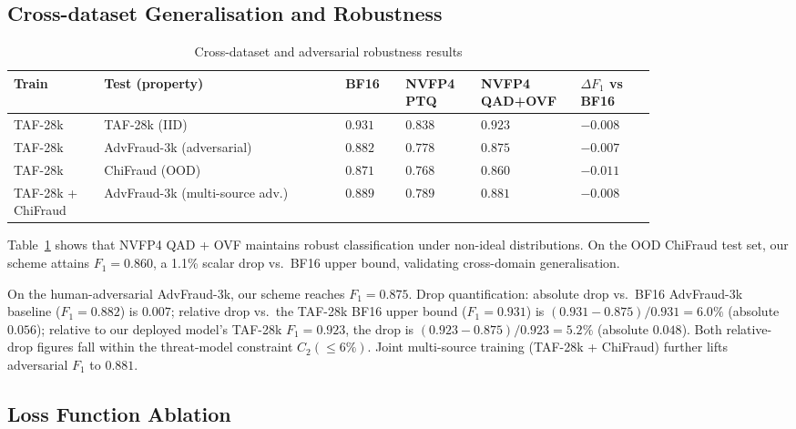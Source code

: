 \documentclass[11pt, a4paper]{article}
\begin{document}
\subsection{Cross-dataset Generalisation and Robustness}

\begin{table}[htbp]
\centering
\caption{Cross-dataset and adversarial robustness results}
\label{tab4-en}
\small
\renewcommand{\arraystretch}{1.15}
\begin{tabular}{>{\raggedright\arraybackslash}p{0.12\linewidth}>{\raggedright\arraybackslash}p{0.32\linewidth}>{\centering\arraybackslash}p{0.08\linewidth}>{\centering\arraybackslash}p{0.1\linewidth}>{\centering\arraybackslash}p{0.1\linewidth}>{\centering\arraybackslash}p{0.1\linewidth}}
\toprule
\textbf{Train} & \textbf{Test (property)} & \textbf{BF16} & \textbf{NVFP4 PTQ} & \textbf{NVFP4 QAD+OVF} & \textbf{$\Delta F_1$ vs BF16} \\
\midrule
TAF-28k & TAF-28k (IID) & $0.931$ & $0.838$ & $\mathbf{0.923}$ & $-0.008$ \\
TAF-28k & AdvFraud-3k (adversarial) & $0.882$ & $0.778$ & $\mathbf{0.875}$ & $-0.007$ \\
TAF-28k & ChiFraud (OOD) & $0.871$ & $0.768$ & $\mathbf{0.860}$ & $-0.011$ \\
TAF-28k + ChiFraud & AdvFraud-3k (multi-source adv.) & $0.889$ & $0.789$ & $\mathbf{0.881}$ & $-0.008$ \\
\bottomrule
\end{tabular}
\end{table}

Table~\ref{tab4-en} shows that NVFP4 QAD + OVF maintains robust classification under non-ideal distributions. On the OOD ChiFraud test set, our scheme attains $F_1 = 0.860$, a 1.1\% scalar drop vs.\ BF16 upper bound, validating cross-domain generalisation.

On the human-adversarial AdvFraud-3k, our scheme reaches $F_1 = 0.875$. Drop quantification: absolute drop vs.\ BF16 AdvFraud-3k baseline ($F_1 = 0.882$) is $0.007$; relative drop vs.\ the TAF-28k BF16 upper bound ($F_1 = 0.931$) is $(0.931 - 0.875)/0.931 = 6.0\%$ (absolute $0.056$); relative to our deployed model's TAF-28k $F_1 = 0.923$, the drop is $(0.923 - 0.875)/0.923 = 5.2\%$ (absolute $0.048$). Both relative-drop figures fall within the threat-model constraint $C_2(\le 6\%)$. Joint multi-source training (TAF-28k + ChiFraud) further lifts adversarial $F_1$ to $0.881$.

\subsection{Loss Function Ablation}
\end{document}
